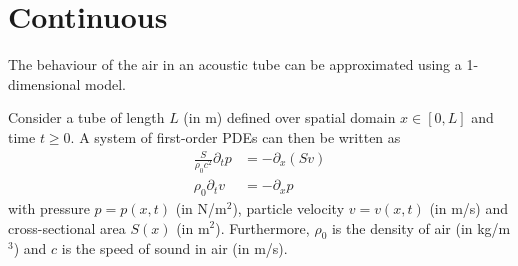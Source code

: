 \section{Continuous}\label{sec:continuous}
The behaviour of the air in an acoustic tube can be approximated using a 1-dimensional model. 

Consider a tube of  length $L$ \SWcomment[$=L(t)$] (in m) defined over spatial domain $x\in [0, L]$ and time $t\geq 0$. A system of first-order PDEs can then be written as
\begin{subequations}\label{eq:firstOrderSystem}
    \begin{align}
        \frac{S}{\rho_0 c^2}\partial_t p &= -\partial_x(Sv)\label{eq:contPressure}\\
        \rho_0\partial_tv &= -\partial_xp\label{eq:discVelocity}
    \end{align}
\end{subequations}
with pressure $p = p(x,t)$ (in N/m$^2$), particle velocity $v = v(x,t)$ (in m/s) and cross-sectional area $S(x)$ (in m$^2$). Furthermore, $\rho_0$ is the density of air (in kg/m$^3$) and $c$ is the speed of sound in air (in m/s).

